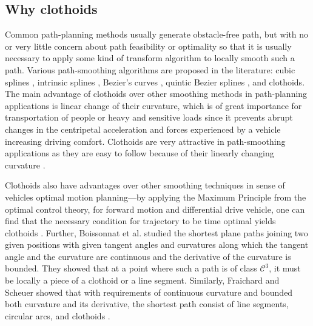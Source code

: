 \documentclass[a4paper,12pt,sort&compress]{article}
\begin{document}
    \subsection{Why clothoids}
    Common path-planning methods usually generate obstacle-free path, but with no or very little concern
    about path feasibility or optimality so that it is usually necessary to apply some kind of transform
    algorithm to locally smooth such a path. Various path-smoothing algorithms are proposed in the
    literature: cubic splines \citep*{kanayama1988smooth}, intrinsic splines
    \citep*{delingette1991trajectory}, Bezier's curves \citep*{segovia1991comparative}, quintic
    Bezier splines \citep*{lau2009kinodynamic}, and clothoids. The main advantage of clothoids over
    other smoothing methods in path-planning
    applications is linear change of their curvature, which is of great importance for transportation of
    people or heavy and sensitive loads since it prevents abrupt changes in the centripetal acceleration
    and forces experienced by a vehicle increasing driving comfort. Clothoids are very attractive in
    path-smoothing applications as they are easy to follow because of their linearly changing
    curvature \citep*{shanmugavel2010co}. 

    Clothoids also have advantages over other smoothing techniques in sense of vehicles optimal motion
    planning—by applying the Maximum Principle from the optimal control theory, for forward
    motion and differential drive vehicle, one can find that the necessary condition for
    trajectory to be time optimal yields clothoids \citep*{388788}. Further, Boissonnat  et al.
    \citep*{BOISSONNAT1999613}  studied
    the shortest plane paths joining two given positions with given tangent angles and
    curvatures along which the tangent angle and the curvature are continuous and the derivative
    of the curvature is bounded. They showed that at a point where such a path is of class $\mathcal{C}^3 $,
    it must be locally a piece of a clothoid or a line segment. Similarly, Fraichard and Scheuer
    \citep{1362698} showed that with requirements of continuous curvature and bounded both curvature and its
    derivative, the shortest path consist of line segments, circular arcs, and clothoids \citep*{6646277}.
\end{document}
